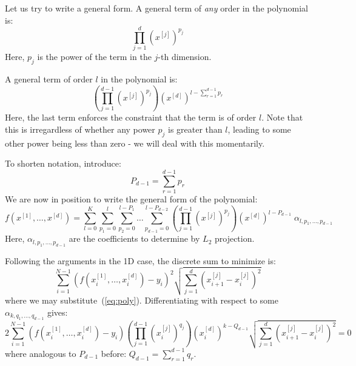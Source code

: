 \documentclass[11pt]{article}
\newcommand{\xdim}[1]{x^{[#1]}}
\begin{document}
Let us try to write a general form. A general term of \textit{any} order in the polynomial is:
\begin{equation}
\prod_{j=1}^d (\xdim{j})^{p_j}
\end{equation}
Here, $p_j$ is the power of the term in the $j$-th dimension.

A general term of order $l$ in the polynomial is:
\begin{equation}
\left ( \prod_{j=1}^{d-1} (\xdim{j})^{p_j} \right ) (\xdim{d})^{l - \sum_{r=1}^{d-1} p_r}
\end{equation}
Here, the last term enforces the constraint that the term is of order $l$. Note that this is irregardless of whether any power $p_j$ is greater than $l$, leading to some other power being less than zero - we will deal with this momentarily.

To shorten notation, introduce:
\begin{equation}
P_{d-1} = \sum_{r=1}^{d-1} p_r
\end{equation}
We are now in position to write the general form of the polynomial:
\begin{equation}
f(\xdim{1},\dots,\xdim{d}) = \sum_{l=0}^K \sum_{p_1=0}^l \sum_{p_2=0}^{l-P_1} \dots \sum_{p_{d-1}=0}^{l - P_{d-2} } 
\left ( \prod_{j=1}^{d-1} (\xdim{j})^{p_j} \right ) (\xdim{d})^{l - P_{d-1}} 
\;
\alpha_{l,p_1,\dots,p_{d-1}} 
\label{eq:poly}
\end{equation}
Here, $\alpha_{l,p_1,\dots,p_{d-1}}$ are the coefficients to determine by $L_2$ projection.

Following the arguments in the 1D case, the discrete sum to minimize is:
\begin{equation}
\sum_{i=1}^{N-1} \left ( f(\xdim{1}_i,\dots,\xdim{d}_i) - y_i \right )^2 \sqrt{ \sum_{j=1}^d ( \xdim{j}_{i+1} - \xdim{j}_i )^2 }
\end{equation}
where we may substitute~(\ref{eq:poly}). Differentiating with respect to some $\alpha_{k,q_1,\dots,q_{d-1}}$ gives:
\begin{equation}
2 \sum_{i=1}^{N-1} \left ( f(\xdim{1}_i,\dots,\xdim{d}_i) - y_i \right ) 
\left ( \prod_{j=1}^{d-1} (\xdim{j}_i)^{q_j} \right ) (\xdim{d}_i)^{k - Q_{d-1}} 
\sqrt{ \sum_{j=1}^d ( \xdim{j}_{i+1} - \xdim{j}_i )^2 }
= 0
\end{equation}
where analogous to $P_{d-1}$ before: $Q_{d-1} = \sum_{r=1}^{d-1} q_r$.
\end{document}
